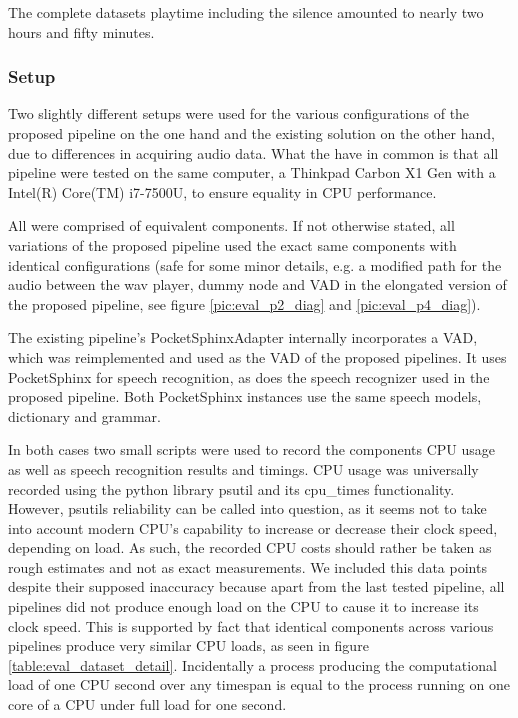 The complete datasets playtime including the silence amounted to nearly two hours and fifty minutes.

\subsubsection{Setup}
\label{eval:dataset:setup}

Two slightly different setups were used for the various configurations of the proposed pipeline on the one hand and the existing solution on the other hand, due to differences in acquiring audio data.
What the have in common is that all pipeline were tested on the same computer, a Thinkpad Carbon X1 Gen with a Intel(R) Core(TM) i7-7500U, to ensure equality in CPU performance.

All were comprised of equivalent components. 
If not otherwise stated, all variations of the proposed pipeline used the exact same components with identical configurations (safe for some minor details, e.g. a modified path for the audio between the wav player, dummy node and VAD in the elongated version of the proposed pipeline, see figure \ref{pic:eval_p2_diag} and \ref{pic:eval_p4_diag}).

The existing pipeline's PocketSphinxAdapter internally incorporates a VAD, which was reimplemented and used as the VAD of the proposed pipelines.
It uses PocketSphinx for speech recognition, as does the speech recognizer used in the proposed pipeline. 
Both PocketSphinx instances use the same speech models, dictionary and grammar.

In both cases two small scripts were used to record the components CPU usage as well as speech recognition results and timings.
CPU usage was universally recorded using the python library psutil and its cpu\_times functionality.
However, psutils reliability can be called into question, as it seems not to take into account modern CPU's capability to increase or decrease their clock speed, depending on load.
As such, the recorded CPU costs should rather be taken as rough estimates and not as exact measurements.
We included this data points despite their supposed inaccuracy because apart from the last tested pipeline, all pipelines did not produce enough load on the CPU to cause it to increase its clock speed.
This is supported by fact that identical components across various pipelines produce very similar CPU loads, as seen in figure 
\ref{table:eval_dataset_detail}.
Incidentally a process producing the computational load of one CPU second over any timespan is equal to the process running on one core of a CPU under full load for one second.

